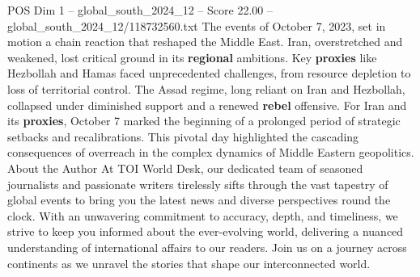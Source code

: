 \begin{textsample}{POS Dim 1 – global\_south\_2024\_12 – Score 22.00 – global\_south\_2024\_12/118732560.txt}
The events of October 7, 2023, set in motion a chain reaction that reshaped the Middle East.
Iran, overstretched and weakened, lost critical ground in its \textbf{regional} ambitions.
Key \textbf{proxies} like Hezbollah and Hamas faced unprecedented challenges, from resource depletion to loss of territorial control.
The Assad regime, long reliant on Iran and Hezbollah, collapsed under diminished support and a renewed \textbf{rebel} offensive.
For Iran and its \textbf{proxies}, October 7 marked the beginning of a prolonged period of strategic setbacks and recalibrations.
This pivotal day highlighted the cascading consequences of overreach in the complex dynamics of Middle Eastern geopolitics.
About the Author At TOI World Desk, our dedicated team of seasoned journalists and passionate writers tirelessly sifts through the vast tapestry of global events to bring you the latest news and diverse perspectives round the clock.
With an unwavering commitment to accuracy, depth, and timeliness, we strive to keep you informed about the ever-evolving world, delivering a nuanced understanding of international affairs to our readers.
Join us on a journey across continents as we unravel the stories that shape our interconnected world.

\end{textsample}
